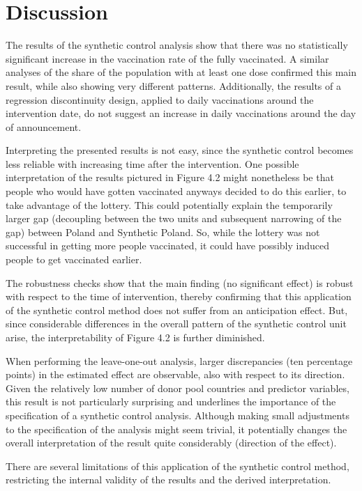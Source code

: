 \documentclass{scrbook}
\begin{document}
\chapter{Discussion}

The results of the synthetic control analysis show that there was no
statistically significant increase in the vaccination rate of the fully
vaccinated. A similar analyses of the share of the population with at
least one dose confirmed this main result, while also showing very
different patterns. Additionally, the results of a regression
discontinuity design, applied to daily vaccinations around the
intervention date, do not suggest an increase in daily vaccinations
around the day of announcement.

Interpreting the presented results is not easy, since the synthetic
control becomes less reliable with increasing time after the
intervention. One possible interpretation of the results pictured in
Figure 4.2 might nonetheless be that people who would have gotten
vaccinated anyways decided to do this earlier, to take advantage of the
lottery. This could potentially explain the temporarily larger gap
(decoupling between the two units and subsequent narrowing of the gap)
between Poland and Synthetic Poland. So, while the lottery was not
successful in getting more people vaccinated, it could have possibly
induced people to get vaccinated earlier.

The robustness checks show that the main finding (no significant effect)
is robust with respect to the time of intervention, thereby confirming
that this application of the synthetic control method does not suffer
from an anticipation effect. But, since considerable differences in the
overall pattern of the synthetic control unit arise, the
interpretability of Figure 4.2 is further diminished.

When performing the leave-one-out analysis, larger discrepancies (ten
percentage points) in the estimated effect are observable, also with
respect to its direction. Given the relatively low number of donor pool
countries and predictor variables, this result is not particularly
surprising and underlines the importance of the specification of a
synthetic control analysis. Although making small adjustments to the
specification of the analysis might seem trivial, it potentially changes
the overall interpretation of the result quite considerably (direction
of the effect).

There are several limitations of this application of the synthetic
control method, restricting the internal validity of the results and the
derived interpretation.
\end{document}
